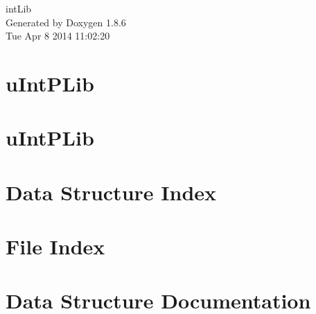 \documentclass[twoside]{book}
\newcommand{\clearemptydoublepage}{%
  \newpage{\pagestyle{empty}\cleardoublepage}%
}
\begin{document}
\hypersetup{pageanchor=false}
\begin{titlepage}
\vspace*{7cm}
\begin{center}%
{\Large int\-Lib }\\
\vspace*{1cm}
{\large Generated by Doxygen 1.8.6}\\
\vspace*{0.5cm}
{\small Tue Apr 8 2014 11:02:20}\\
\end{center}
\end{titlepage}
\clearemptydoublepage
\tableofcontents
\clearemptydoublepage
{}
\hypersetup{pageanchor=true}

\chapter{u\-Int\-P\-Lib}
\label{md__r_e_a_d_m_e_1}
\hypertarget{md__r_e_a_d_m_e_1}{}

\chapter{u\-Int\-P\-Lib}
\label{md__r_e_a_d_m_e}
\hypertarget{md__r_e_a_d_m_e}{}

\chapter{Data Structure Index}

\chapter{File Index}

\chapter{Data Structure Documentation}




\end{document}
